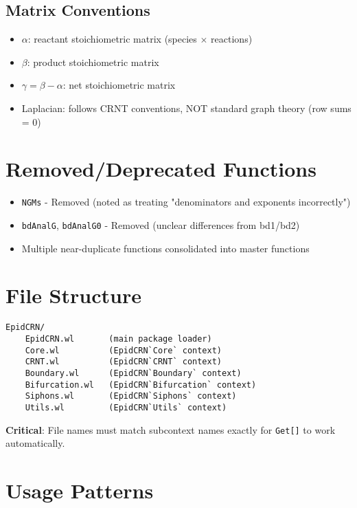 \documentclass{article}
\begin{document}
\subsection{Matrix Conventions}
\begin{itemize}
\item $\alpha$: reactant stoichiometric matrix (species $\times$ reactions)
\item $\beta$: product stoichiometric matrix
\item $\gamma = \beta - \alpha$: net stoichiometric matrix
\item Laplacian: follows CRNT conventions, NOT standard graph theory (row sums = 0)
\end{itemize}

\section{Removed/Deprecated Functions}

\begin{itemize}
\item \texttt{NGMs} - Removed (noted as treating "denominators and exponents incorrectly")
\item \texttt{bdAnalG}, \texttt{bdAnalG0} - Removed (unclear differences from bd1/bd2)
\item Multiple near-duplicate functions consolidated into master functions
\end{itemize}

\section{File Structure}

\begin{verbatim}
EpidCRN/
    EpidCRN.wl       (main package loader)
    Core.wl          (EpidCRN`Core` context)
    CRNT.wl          (EpidCRN`CRNT` context)
    Boundary.wl      (EpidCRN`Boundary` context)
    Bifurcation.wl   (EpidCRN`Bifurcation` context)
    Siphons.wl       (EpidCRN`Siphons` context)
    Utils.wl         (EpidCRN`Utils` context)
\end{verbatim}

\textbf{Critical}: File names must match subcontext names exactly for \texttt{Get[]} to work automatically.

\section{Usage Patterns}
\end{document}
